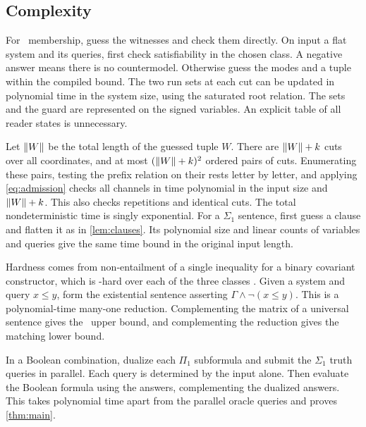 \subsection{Complexity}

For \NExp\ membership, guess the witnesses and check them directly.
On input a flat system and its queries, first check satisfiability
in the chosen class. A negative answer means there is no
countermodel. Otherwise guess the modes and a tuple within the
compiled bound. The two run sets at each cut can be updated in
polynomial time in the system size, using the saturated root
relation. The sets and the guard are represented on the signed
variables. An explicit table of all reader states is unnecessary.

Let $\lVert W\rVert$ be the total length of the guessed tuple $W$. There are
$\lVert W\rVert+k$ cuts over all coordinates, and at most $(\lVert W\rVert+k)^2$ ordered
pairs of cuts.
Enumerating these pairs, testing the prefix relation on their
rests letter by letter, and applying \eqref{eq:admission} checks all
channels in time polynomial in the input size and $\lVert W\rVert+k$. This
also checks repetitions and identical cuts. The total nondeterministic
time is singly exponential. For a $\Sigma_1$ sentence, first guess
a clause and flatten it as in \cref{lem:clauses}. Its polynomial
size and linear counts of variables and queries give the same
time bound in the original input length.

Hardness comes from non-entailment of a single inequality for a
binary covariant constructor, which is \NExp-hard over each of the
three classes \cite{NSSE26}. Given a system and query $x\le y$,
form the existential sentence asserting $\Gamma\land\neg(x\le y)$.
This is a polynomial-time many-one reduction. Complementing the
matrix of a universal sentence gives the \coNExp\ upper bound,
and complementing the reduction gives the matching lower bound.

In a Boolean combination, dualize each $\Pi_1$ subformula and
submit the $\Sigma_1$ truth queries in parallel. Each query is
determined by the input alone. Then evaluate the Boolean formula
using the answers, complementing the dualized answers. This takes
polynomial time apart from the parallel oracle queries and proves
\cref{thm:main}.
